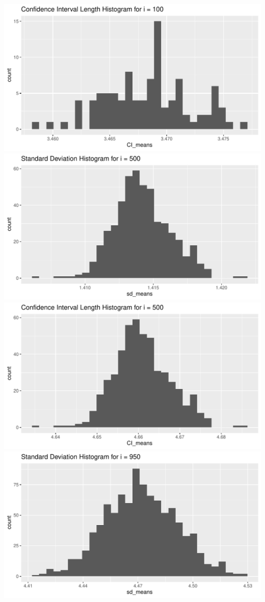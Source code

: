 \documentclass[
]{article}
\begin{document}
\includegraphics{report_files/figure-latex/task_2-4.pdf}
\includegraphics{report_files/figure-latex/task_2-5.pdf}
\includegraphics{report_files/figure-latex/task_2-6.pdf}
\includegraphics{report_files/figure-latex/task_2-7.pdf}
\end{document}
